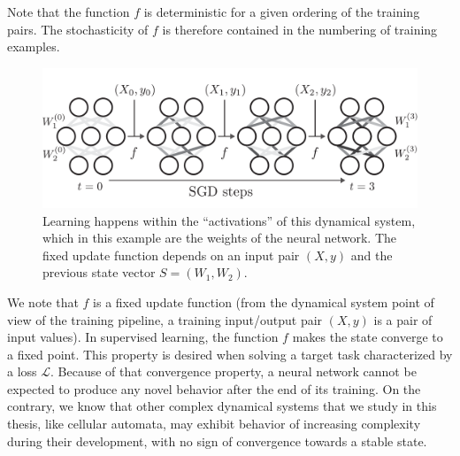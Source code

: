 Note that the function $f$ is deterministic for a given ordering of the training
pairs. The stochasticity of $f$ is therefore contained in the numbering of
training examples.

\begin{figure}[ht]
  \centering
  \includegraphics[width=.9\linewidth]{figures/learning_nn.pdf}
  \caption{\label{fig:label} Learning happens within the ``activations'' of this
    dynamical system, which in this example are the weights of the neural
    network. The fixed update function depends on an input pair $(X, y)$
    and the previous state vector $S = (W_1, W_2)$.}
\end{figure}

We note that $f$ is a fixed update function (from the dynamical system point of
view of the training pipeline, a training input/output pair $(X, y)$ is a pair
of input values). In supervised learning, the function $f$ makes the state
converge to a fixed point. This property is desired when solving a target task
characterized by a loss $\mathcal{L}$. Because of that convergence property, a neural
network cannot be expected to produce any novel behavior after the end of its
training. On the contrary, we know that other complex dynamical systems that we
study in this thesis, like cellular automata, may exhibit behavior of increasing
complexity during their development, with no sign of convergence towards a
stable state.
